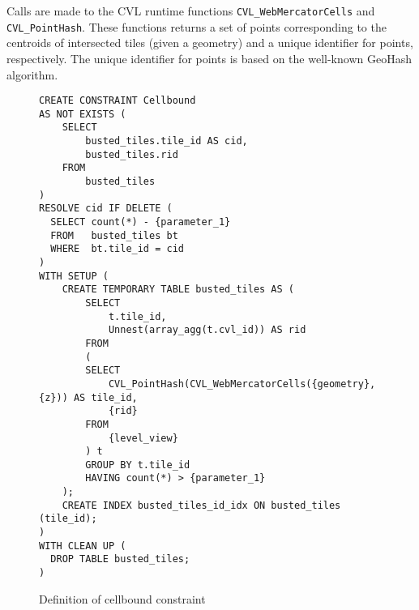 Calls are made to the CVL runtime functions \texttt{CVL\_WebMercatorCells} and \texttt{CVL\_PointHash}. These functions returns a set of points corresponding to the centroids of intersected tiles (given a geometry) and a unique identifier for points, respectively. The unique identifier for points is based on the well-known GeoHash algorithm.

\begin{figure}[htbp]
\begin{center}
\begin{lstlisting}
CREATE CONSTRAINT Cellbound
AS NOT EXISTS (
    SELECT
        busted_tiles.tile_id AS cid,
        busted_tiles.rid
    FROM
        busted_tiles
)
RESOLVE cid IF DELETE (
  SELECT count(*) - {parameter_1}
  FROM   busted_tiles bt
  WHERE  bt.tile_id = cid
)
WITH SETUP (
    CREATE TEMPORARY TABLE busted_tiles AS (
        SELECT
            t.tile_id,
            Unnest(array_agg(t.cvl_id)) AS rid
        FROM
        (
        SELECT
            CVL_PointHash(CVL_WebMercatorCells({geometry}, {z})) AS tile_id,
            {rid}
        FROM
            {level_view}
        ) t
        GROUP BY t.tile_id
        HAVING count(*) > {parameter_1}
    );
    CREATE INDEX busted_tiles_id_idx ON busted_tiles (tile_id);
)
WITH CLEAN UP (
  DROP TABLE busted_tiles;
)
\end{lstlisting}
\caption{Definition of cellbound constraint}
\label{fig:cellbound-definition}
\end{center}
\end{figure}


